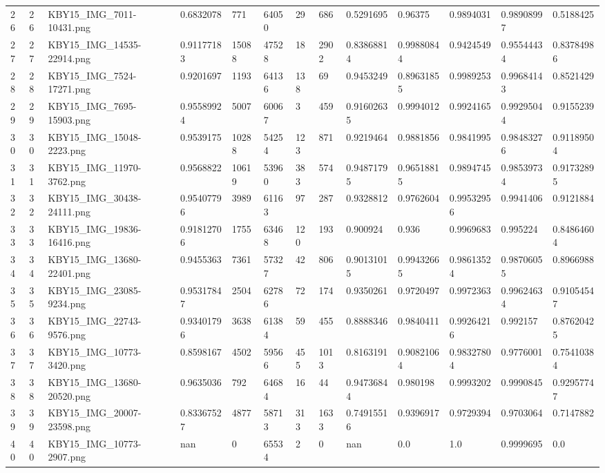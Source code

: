 \documentclass[11pt, a4paper, twoside]{report}
\begin{document}
\begin{longtable}[c]{@{}lllllllllllll@{}}
26 & 26 & KBY15\_IMG\_7011-10431.png & 0.6832078 & 771 & 64050 & 29 & 686 & 0.5291695 & 0.96375 & 0.9894031 & 0.98908997 & 0.5188425 \\
27 & 27 & KBY15\_IMG\_14535-22914.png & 0.91177183 & 15088 & 47528 & 18 & 2902 & 0.83868814 & 0.99880844 & 0.9424549 & 0.95544434 & 0.83784986 \\
28 & 28 & KBY15\_IMG\_7524-17271.png & 0.9201697 & 1193 & 64136 & 138 & 69 & 0.9453249 & 0.89631855 & 0.9989253 & 0.99684143 & 0.8521429 \\
29 & 29 & KBY15\_IMG\_7695-15903.png & 0.95589924 & 5007 & 60067 & 3 & 459 & 0.91602635 & 0.9994012 & 0.9924165 & 0.99295044 & 0.9155239 \\
30 & 30 & KBY15\_IMG\_15048-2223.png & 0.9539175 & 10288 & 54254 & 123 & 871 & 0.9219464 & 0.9881856 & 0.9841995 & 0.98483276 & 0.91189504 \\
31 & 31 & KBY15\_IMG\_11970-3762.png & 0.9568822 & 10619 & 53960 & 383 & 574 & 0.94871795 & 0.96518815 & 0.9894745 & 0.98539734 & 0.91732895 \\
32 & 32 & KBY15\_IMG\_30438-24111.png & 0.95407796 & 3989 & 61163 & 97 & 287 & 0.9328812 & 0.9762604 & 0.99532956 & 0.9941406 & 0.9121884 \\
33 & 33 & KBY15\_IMG\_19836-16416.png & 0.91812706 & 1755 & 63468 & 120 & 193 & 0.900924 & 0.936 & 0.9969683 & 0.995224 & 0.84864604 \\
34 & 34 & KBY15\_IMG\_13680-22401.png & 0.9455363 & 7361 & 57327 & 42 & 806 & 0.90131015 & 0.99432665 & 0.98613524 & 0.98706055 & 0.8966988 \\
35 & 35 & KBY15\_IMG\_23085-9234.png & 0.95317847 & 2504 & 62786 & 72 & 174 & 0.9350261 & 0.9720497 & 0.9972363 & 0.99624634 & 0.91054547 \\
36 & 36 & KBY15\_IMG\_22743-9576.png & 0.93401796 & 3638 & 61384 & 59 & 455 & 0.8888346 & 0.9840411 & 0.99264216 & 0.992157 & 0.87620425 \\
37 & 37 & KBY15\_IMG\_10773-3420.png & 0.8598167 & 4502 & 59566 & 455 & 1013 & 0.8163191 & 0.90821064 & 0.98327804 & 0.9776001 & 0.75410384 \\
38 & 38 & KBY15\_IMG\_13680-20520.png & 0.9635036 & 792 & 64684 & 16 & 44 & 0.94736844 & 0.980198 & 0.9993202 & 0.9990845 & 0.92957747 \\
39 & 39 & KBY15\_IMG\_20007-23598.png & 0.83367527 & 4877 & 58713 & 313 & 1633 & 0.74915516 & 0.9396917 & 0.9729394 & 0.9703064 & 0.7147882 \\
40 & 40 & KBY15\_IMG\_10773-2907.png & nan & 0 & 65534 & 2 & 0 & nan & 0.0 & 1.0 & 0.9999695 & 0.0 \\

\end{longtable}
\end{document}
